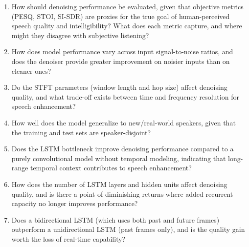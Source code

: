 \documentclass[11pt, letterpaper]{article}
\begin{document}
\begin{enumerate}

	\item How should denoising performance be evaluated, given that objective metrics 
	(PESQ, STOI, SI-SDR) are proxies for the true goal of human-perceived speech
	quality and intelligibility? What does each metric capture, and where might they
	disagree with subjective listening?

    \item How does model performance vary across input signal-to-noise
    ratios, and does the denoiser provide greater improvement on
    noisier inputs than on cleaner ones?

    \item Do the STFT parameters (window length and hop
    size) affect denoising quality, and what trade-off exists between
    time and frequency resolution for speech enhancement?

    \item How well does the model generalize to new/real-world speakers, given
    that the training and test sets are speaker-disjoint?
    
    \item Does the LSTM bottleneck improve denoising
    performance compared to a purely convolutional model without
    temporal modeling, indicating that long-range temporal context
    contributes to speech enhancement?

    \item How does the number of LSTM layers and hidden units affect
    denoising quality, and is there a point of diminishing returns
    where added recurrent capacity no longer improves performance?

    \item Does a bidirectional LSTM (which uses both past and future
    frames) outperform a unidirectional LSTM (past frames only), and
    is the quality gain worth the loss of real-time capability?

\end{enumerate}
\end{document}
